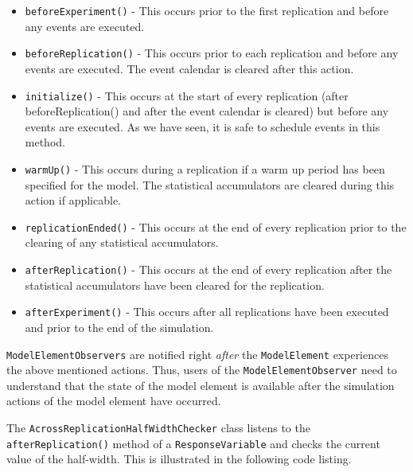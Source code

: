 \documentclass[
]{book}
\theoremstyle{definition}
\theoremstyle{definition}
\theoremstyle{definition}
\theoremstyle{definition}
\theoremstyle{remark}
\begin{document}
\begin{itemize}
\item
  \texttt{beforeExperiment()} - This occurs prior to the first replication and
  before any events are executed.
\item
  \texttt{beforeReplication()} - This occurs prior to each replication and
  before any events are executed. The event calendar is cleared after
  this action.
\item
  \texttt{initialize()} - This occurs at the start of every replication (after
  beforeReplication() and after the event calendar is cleared) but
  before any events are executed. As we have seen, it is safe to
  schedule events in this method.
\item
  \texttt{warmUp()} - This occurs during a replication if a warm up period has
  been specified for the model. The statistical accumulators are
  cleared during this action if applicable.
\item
  \texttt{replicationEnded()} - This occurs at the end of every replication
  prior to the clearing of any statistical accumulators.
\item
  \texttt{afterReplication()} - This occurs at the end of every replication
  after the statistical accumulators have been cleared for the
  replication.
\item
  \texttt{afterExperiment()} - This occurs after all replications have been
  executed and prior to the end of the simulation.
\end{itemize}

\texttt{ModelElementObservers} are notified right \emph{after} the \texttt{ModelElement}
experiences the above mentioned actions. Thus, users of the
\texttt{ModelElementObserver} need to understand that the state of the model
element is available after the simulation actions of the model element
have occurred.

The \texttt{AcrossReplicationHalfWidthChecker} class listens to the
\texttt{afterReplication()} method of a \texttt{ResponseVariable} and checks the current
value of the half-width. This is illustrated in the following code listing.
\end{document}
